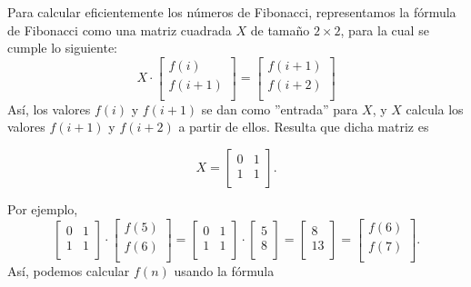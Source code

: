 \begin{samepage}
Para calcular eficientemente los números de Fibonacci,
representamos la
fórmula de Fibonacci como una
matriz cuadrada $X$ de tamaño $2 \times 2$,
para la cual se cumple lo siguiente:
\[ X \cdot
 \begin{bmatrix}
  f(i) \\
  f(i+1) \\
 \end{bmatrix}
=
 \begin{bmatrix}
  f(i+1) \\
  f(i+2) \\
 \end{bmatrix}
 \]
Así, los valores $f(i)$ y $f(i+1)$ se dan como
''entrada'' para $X$,
y $X$ calcula los valores $f(i+1)$ y $f(i+2)$
a partir de ellos.
Resulta que dicha matriz es

\[ X = 
 \begin{bmatrix}
  0 & 1 \\
  1 & 1 \\
 \end{bmatrix}.
\]
\end{samepage}
\noindent
Por ejemplo,
\[
 \begin{bmatrix}
  0 & 1 \\
  1 & 1 \\
 \end{bmatrix}
\cdot
 \begin{bmatrix}
  f(5) \\
  f(6) \\
 \end{bmatrix}
=
 \begin{bmatrix}
  0 & 1 \\
  1 & 1 \\
 \end{bmatrix}
\cdot
 \begin{bmatrix}
  5 \\
  8 \\
 \end{bmatrix}
=
 \begin{bmatrix}
  8 \\
  13 \\
 \end{bmatrix}
=
 \begin{bmatrix}
  f(6) \\
  f(7) \\
 \end{bmatrix}.
\]
Así, podemos calcular $f(n)$ usando la fórmula
